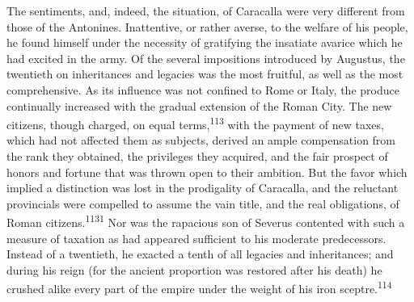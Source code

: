The sentiments, and, indeed, the situation, of Caracalla were
very different from those of the Antonines. Inattentive, or
rather averse, to the welfare of his people, he found himself
under the necessity of gratifying the insatiate avarice which he
had excited in the army. Of the several impositions introduced by
Augustus, the twentieth on inheritances and legacies was the most
fruitful, as well as the most comprehensive. As its influence was
not confined to Rome or Italy, the produce continually increased
with the gradual extension of the Roman City. The new citizens,
though charged, on equal terms,\textsuperscript{113} with the payment of new
taxes, which had not affected them as subjects, derived an ample
compensation from the rank they obtained, the privileges they
acquired, and the fair prospect of honors and fortune that was
thrown open to their ambition. But the favor which implied a
distinction was lost in the prodigality of Caracalla, and the
reluctant provincials were compelled to assume the vain title,
and the real obligations, of Roman citizens.\textsuperscript{1131} Nor was the
rapacious son of Severus contented with such a measure of
taxation as had appeared sufficient to his moderate predecessors.
Instead of a twentieth, he exacted a tenth of all legacies and
inheritances; and during his reign (for the ancient proportion
was restored after his death) he crushed alike every part of the
empire under the weight of his iron sceptre.\textsuperscript{114}




